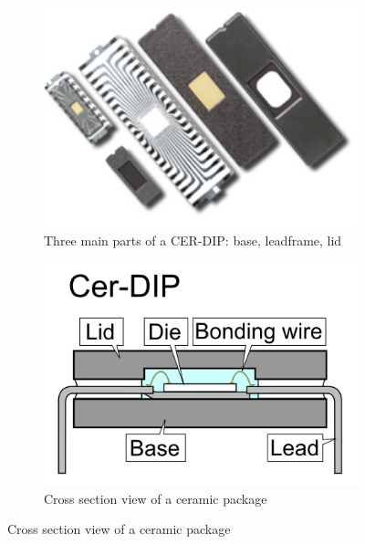 \documentclass[final]{cubedoc}
\begin{document}
	
	\begin{figure}[h!]
		\centering
		\begin{subfigure}{.5\textwidth}
			\centering
			\includegraphics[height=0.2\textheight, width=\textwidth, keepaspectratio]{docs/cer_dip_real.png}
			\caption{Three main parts of a CER-DIP: base, leadframe, lid}
			\label{fig:sub1}
		\end{subfigure}%
		\begin{subfigure}{.5\textwidth}
			\centering
			\includegraphics[height=0.2\textheight, width=\textwidth, keepaspectratio]{docs/cdip.PNG}
			\caption{Cross section view of a ceramic package}
			\label{fig:sub2}
		\end{subfigure}
		\label{fig:test}
	\end{figure}
	
\end{document}
